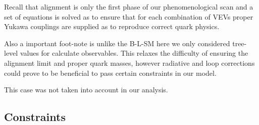 Recall that alignment is only the first phase of our phenomenological scan and a set of equations is solved as to ensure that for each combination of VEVs proper Yukawa couplings are supplied as to reproduce correct quark physics.

Also a important foot-note is unlike the B-L-SM here we only considered tree-level values for calculate observables.
%
This relaxes the difficulty of ensuring the alignment limit and proper quark masses, however radiative and loop corrections could prove to be beneficial to pass certain constraints in our model.

This case was not taken into account in our analysis.

\subsection{Constraints}

